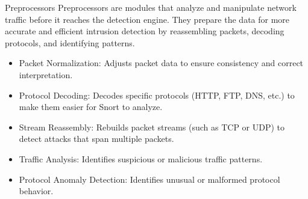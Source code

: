 \begin{frame}[t]{Preprocessors}
  \fontsize{12}{14.5}\selectfont
  \vspace{0.1cm}
  Preprocessors are modules that analyze and manipulate network traffic before it reaches the detection engine. They prepare the data for more accurate and efficient intrusion detection by reassembling packets, decoding protocols, and identifying patterns.
  \vspace{0.15cm}
  \begin{itemize}
    \item \textcolor{WarningColor}{Packet Normalization:} Adjusts packet data to ensure consistency and correct interpretation.
    \item \textcolor{WarningColor}{Protocol Decoding:} Decodes specific protocols (HTTP, FTP, DNS, etc.) to make them easier for Snort to analyze.
    \item \textcolor{WarningColor}{Stream Reassembly:} Rebuilds packet streams (such as TCP or UDP) to detect attacks that span multiple packets.
    \item \textcolor{WarningColor}{Traffic Analysis:} Identifies suspicious or malicious traffic patterns.
    \item \textcolor{WarningColor}{Protocol Anomaly Detection:} Identifies unusual or malformed protocol behavior.
  \end{itemize}
\end{frame}
